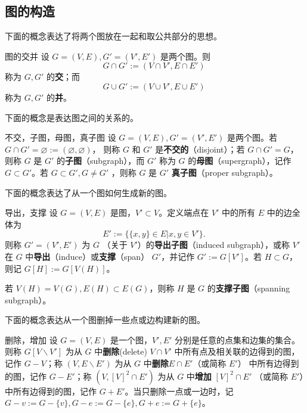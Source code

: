 \subsection{图的构造}
下面的概念表达了将两个图放在一起和取公共部分的思想。

\begin{definition}{图的交并}
设 $G=(V,E),G'=(V',E')$ 是两个图。则
\begin{equation}
G\cap G':=(V\cap V',E\cap E')~
\end{equation}
称为 $G,G'$ 的\textbf{交}；而
\begin{equation}
G\cup G':=(V\cup V',E\cup E')~
\end{equation}
称为 $G,G'$ 的\textbf{并}。
\end{definition}

下面的概念是表达图之间的关系的。

\begin{definition}{不交，子图，母图，真子图}
设 $G=(V,E),G'=(V',E')$ 是两个图。若 $G\cap G'=\varnothing:=(\varnothing,\varnothing)$， 则称 $G$ 和 $G'$ 是\textbf{不交的}（disjoint）；若 $G\cap G'=G$，则称 $G$ 是 $G'$ 的\textbf{子图}（subgraph），而 $G'$ 称为 $G$ 的\textbf{母图}（supergraph），记作 $G\subset G'$。若 $G\subset G', G\neq G'$ ，则称 $G$ 是 $G'$ \textbf{真子图}（proper subgraph）。
\end{definition}

下面的概念表达了从一个图如何生成新的图。

\begin{definition}{导出，支撑}
设 $G=(V,E)$ 是图，$V'\subset V$。定义端点在 $V'$ 中的所有 $E$ 中的边全体为
\begin{equation}
E':=\{\{x,y\}\in E|x,y\in V'\}.~
\end{equation}
则称 $G'=(V',E')$ 为 $G$ （关于 $V'$）的\textbf{导出子图}（induced subgraph），或称 $V'$ 在 $G$ 中\textbf{导出}（induce）或\textbf{支撑}（span） $G'$，并记作 $G':=G[V']$。若 $H\subset G$，则记 $G[H]:=G[V(H)]$。

若 $V(H)=V(G),E(H)\subset E(G)$，则称 $H$ 是 $G$ 的\textbf{支撑子图}（spanning subgraph）。
\end{definition}
下面的概念表达从一个图删掉一些点或边构建新的图。
\begin{definition}{删除，增加}
设 $G=(V,E)$ 是一个图，$V',E'$ 分别是任意的点集和边集的集合。则称 $G[V\backslash V']$ 为从 $G$ 中\textbf{删除}(delete) $V\cap V'$ 中所有点及相关联的边得到的图，记作 $G-V$；称
 $(V,E\backslash E')$ 为从 $G$ 中\textbf{删除}$E\cap E'$（或简称 $E'$） 中所有边得到的图，记作 $G-E'$；称 $(V,[V]^2\cap E')$ 为从 $G$ 中\textbf{增加} $[V]^2\cap E'$ （或简称 $E'$）中所有边得到的图，记作 $G+E'$。当只删除一点或一边时，记 $G-v:=G-\{v\},G-e:=G-\{e\},G+e:=G+\{e\}$。
\end{definition}





